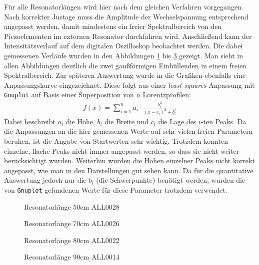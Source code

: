 \documentclass[11pt, a4paper]{article}
\numberwithin{equation}{section}
\begin{document}
Für alle Resonatorlängen wird hier nach dem gleichen Verfahren vorgegangen.
Nach korrekter Justage muss die Amplitude der Wechselspannung entsprechend angepasst werden, damit mindestens ein freier Spektralbereich von den Piezoelementen im externen Resonator durchfahren wird.
Anschließend kann der Intensitätsverlauf auf dem digitalen Oszilloskop beobachtet werden.
Die dabei gemessenen Verläufe wurden in den Abbildungen \ref{fig:ALL0028} bis \ref{fig:ALL0014} gezeigt.
Man sieht in allen Abbildungen deutlich die zwei gaußförmigen Einhüllenden in einem freien Spektralbereich.
Zur späteren Auswertung wurde in die Grafiken ebenfalls eine Anpassungskurve eingezeichnet.
Diese folgt aus einer \emph{least-squares}-Anpassung mit \texttt{Gnuplot} auf Basis einer Superposition von $n$ Lorentzprofilen:
\begin{align}
f(x)=\sum_{i=1}^{n}a_i\cdot\frac{b_i^2}{(x-c_i)^2+b_i^2}
\end{align}
Dabei beschreibt $a_i$ die Höhe, $b_i$ die Breite und $c_i$ die Lage des $i$-ten Peaks.
Da die Anpassungen an die hier gemessenen Werte auf sehr vielen freien Parametern beruhen, ist die Angabe von Startwerten sehr wichtig.
Trotzdem konnten einzelne, flache Peaks nicht immer angepasst werden, so dass sie nicht weiter berücksichtigt wurden.
Weiterhin wurden die Höhen einzelner Peaks nicht korrekt angepasst, wie man in den Darstellungen gut sehen kann.
Da für die quantitative Auswertung jedoch nur die $b_i$ (die Schwerpunkte) benötigt werden, wurden die von \texttt{Gnuplot} gefundenen Werte für diese Parameter trotzdem verwendet.
\begin{figure}[htb]
\centering

\caption{Resonatorlänge 50cm ALL0028}
\label{fig:ALL0028}
\end{figure}
\begin{figure}[htb]
\centering

\caption{Resonatorlänge 70cm ALL0026}
\end{figure}
\label{fig:ALL0026}
\begin{figure}[htb]
\centering

\caption{Resonatorlänge 80cm ALL0022}
\label{fig:ALL0022}
\end{figure}
\begin{figure}[htb]
\centering

\caption{Resonatorlänge 90cm ALL0014}
\label{fig:ALL0014}
\end{figure}
\FloatBarrier
\end{document}
